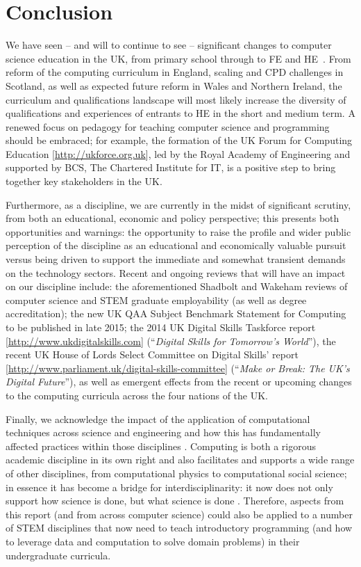 \documentclass[conference,compsoc]{IEEEtran}
\begin{document}
\section{Conclusion}
 
We have seen -- and will to continue to see -- significant changes to computer science education in the UK, from primary school through to FE and HE~\cite{brown-et-al-toce2014}. From reform of the computing curriculum in England, scaling and CPD challenges in Scotland, as well as expected future reform in Wales and Northern Ireland, the curriculum and qualifications landscape will most likely increase the diversity of qualifications and experiences of entrants to HE in the short and medium term. A renewed focus on pedagogy for teaching 
computer science and programming should be embraced; for example, the
formation of the UK Forum for Computing Education [\url{http://ukforce.org.uk}], led by the Royal Academy of Engineering and supported by BCS, The Chartered Institute for IT, is a positive step to bring together key stakeholders in the UK.
 
Furthermore, as a discipline, we are currently in the midst of
significant scrutiny, from both an educational, economic and policy
perspective; this presents both opportunities and warnings: the
opportunity to raise the profile and wider public perception of the
discipline as an educational and economically valuable pursuit versus
being driven to support the immediate and somewhat transient demands
on the technology sectors. Recent and ongoing reviews that will have
an impact on our discipline include: the aforementioned Shadbolt and
Wakeham reviews of computer science and STEM graduate employability
(as well as degree accreditation); the new UK QAA Subject Benchmark
Statement for Computing to be published in late 2015; the 2014 UK
Digital Skills Taskforce report [\url{http://www.ukdigitalskills.com}]
(``{\emph{Digital Skills for Tomorrow's World}}''), the recent UK
House of Lords Select Committee on Digital Skills' report
[\url{http://www.parliament.uk/digital-skills-committee}]
(``{\emph{Make or Break: The UK's Digital Future}}''), as well as
emergent effects from the recent or upcoming changes to the computing
curricula across the four nations of the UK.
 
Finally, we acknowledge the impact of the application of computational techniques across science and engineering and how this has fundamentally affected practices within those disciplines \cite{Crick}. Computing is both a rigorous academic discipline in its own right and also facilitates and supports a wide range of other disciplines, from computational physics to computational social science; in essence it has become a bridge for interdisciplinarity: it now does not only support how science is done, but what science is done \cite{RS}. Therefore, aspects from this report (and from across computer science) could also be applied to a number of STEM disciplines that now need to teach introductory programming (and how to leverage data and computation to solve domain problems) in their undergraduate curricula.
\end{document}
